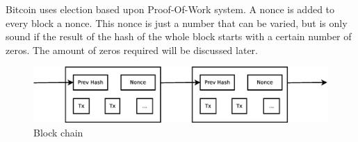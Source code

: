 Bitcoin uses election based upon Proof-Of-Work system.
A nonce is added to every block a nonce. 
This nonce is just a number that can be varied,
but is only sound if the result of the hash of the whole block starts with a certain number of zeros.
The amount of zeros required will be discussed later.

\begin{figure}[H]
        \centerline{\includegraphics[scale=0.3]{problemDescription/figs/blocks.eps}}
        \caption{Block chain}
\end{figure}

